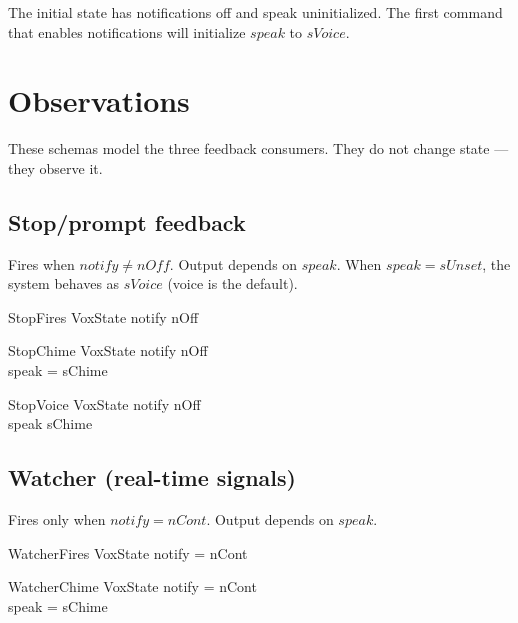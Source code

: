 \documentclass[a4paper,10pt,fleqn]{article}
\begin{document}
The initial state has notifications off and speak uninitialized.
The first command that enables notifications will initialize
$speak$ to $sVoice$.

\section{Observations}

These schemas model the three feedback consumers. They do not
change state --- they observe it.

\subsection{Stop/prompt feedback}

Fires when $notify \neq nOff$. Output depends on $speak$.
When $speak = sUnset$, the system behaves as $sVoice$
(voice is the default).

\begin{schema}{StopFires}
  \Xi VoxState
  \where
  notify \neq nOff
\end{schema}

\begin{schema}{StopChime}
  \Xi VoxState
  \where
  notify \neq nOff \\
  speak = sChime
\end{schema}

\begin{schema}{StopVoice}
  \Xi VoxState
  \where
  notify \neq nOff \\
  speak \neq sChime
\end{schema}

\subsection{Watcher (real-time signals)}

Fires only when $notify = nCont$. Output depends on $speak$.

\begin{schema}{WatcherFires}
  \Xi VoxState
  \where
  notify = nCont
\end{schema}

\begin{schema}{WatcherChime}
  \Xi VoxState
  \where
  notify = nCont \\
  speak = sChime
\end{schema}
\end{document}
